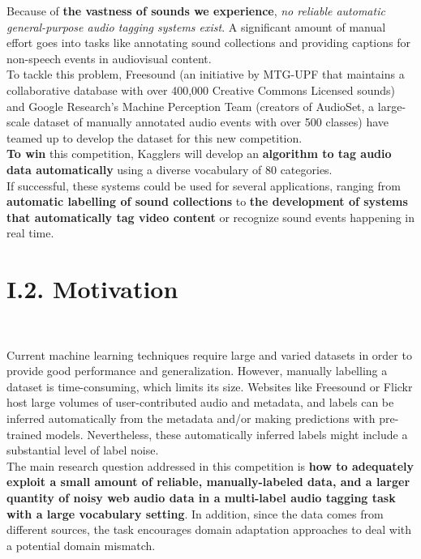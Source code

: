 \documentclass[11pt, a4papper]{report}
\theoremstyle{plain}
\theoremstyle{definition}
\theoremstyle{definition}
\theoremstyle{proposition}
\begin{document}
Because of \textbf{the vastness of sounds we experience}, \textit{no reliable automatic general-purpose audio tagging systems exist}. A significant amount of manual effort goes into tasks like annotating sound collections and providing captions for non-speech events in audiovisual content.
\\

To tackle this problem, Freesound (an initiative by MTG-UPF that maintains a collaborative database with over 400,000 Creative Commons Licensed sounds) and Google Research’s Machine Perception Team (creators of AudioSet, a large-scale dataset of manually annotated audio events with over 500 classes) have teamed up to develop the dataset for this new competition.
\\

\textbf{To win} this competition, Kagglers will develop an \textbf{algorithm to tag audio data automatically} using a diverse vocabulary of 80 categories.
\\

If successful, these systems could be used for several applications, ranging from \textbf{automatic labelling of sound collections} to \textbf{the development of systems that automatically tag video content} or recognize sound events happening in real time.

\section*{I.2. Motivation}
\

Current machine learning techniques require large and varied datasets in order to provide good performance and generalization. However, manually labelling a dataset is time-consuming, which limits its size. Websites like Freesound or Flickr host large volumes of user-contributed audio and metadata, and labels can be inferred automatically from the metadata and/or making predictions with pre-trained models. Nevertheless, these automatically inferred labels might include a substantial level of label noise.
\\

The main research question addressed in this competition is \textbf{how to adequately exploit a small amount of reliable, manually-labeled data, and a larger quantity of noisy web audio data in a multi-label audio tagging task with a large vocabulary setting}. In addition, since the data comes from different sources, the task encourages domain adaptation approaches to deal with a potential domain mismatch.
\end{document}
